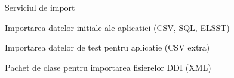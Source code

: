 
Serviciul de import

Importarea datelor initiale ale aplicatiei (CSV, SQL, ELSST)

Importarea datelor de test pentru aplicatie (CSV extra)

Pachet de clase pentru importarea fisierelor DDI (XML)


